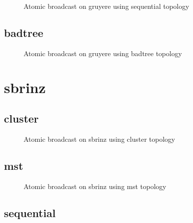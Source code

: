 \begin{figure}[ht!]

\caption{Atomic broadcast on gruyere using sequential topology}
\label{fig:ab_gruyere_sequential}
\end{figure}
\clearpage\subsection{badtree}

\begin{figure}[ht!]

\caption{Atomic broadcast on gruyere using badtree topology}
\label{fig:ab_gruyere_badtree}
\end{figure}
\clearpage\newpage\clearpage\section{sbrinz}

\subsection{cluster}

\begin{figure}[ht!]

\caption{Atomic broadcast on sbrinz using cluster topology}
\label{fig:ab_sbrinz_cluster}
\end{figure}
\clearpage\subsection{mst}

\begin{figure}[ht!]

\caption{Atomic broadcast on sbrinz using mst topology}
\label{fig:ab_sbrinz_mst}
\end{figure}
\clearpage\subsection{sequential}


